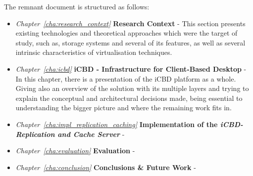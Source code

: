 The remnant document is structured as follows: 

\begin{itemize}

  \item \textit{Chapter~\ref{cha:research_context}}  \textbf{Research Context} - This section presents existing technologies and theoretical approaches which were the target of study, such as, storage systems and several of its features, as well as several intrinsic characteristics of virtualisation techniques.
  \item \textit{Chapter~\ref{cha:icbd}} \textbf{iCBD - Infrastructure for Client-Based Desktop} - In this chapter, there is a presentation of the iCBD platform as a whole. Giving also an overview of the solution with its multiple layers and trying to explain the conceptual and architectural decisions made, being essential to understanding the bigger picture and where the remaining work fits in.
  \item \textit{Chapter~\ref{cha:impl_replication_caching}} \textbf{Implementation of the \textit{iCBD-Replication and Cache Server}} -
  \item \textit{Chapter~\ref{cha:evaluation}} \textbf{Evaluation} - 
  \item \textit{Chapter~\ref{cha:conclusion}} \textbf{Conclusions \& Future Work} - 
\end{itemize}

